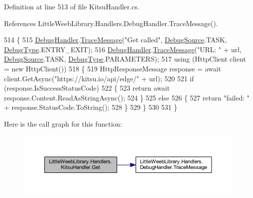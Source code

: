 Definition at line 513 of file Kitsu\+Handler.\+cs.



References Little\+Weeb\+Library.\+Handlers.\+Debug\+Handler.\+Trace\+Message().


\begin{DoxyCode}
514         \{
515             \mbox{\hyperlink{class_little_weeb_library_1_1_handlers_1_1_kitsu_handler_a6d3c55fa5eee15320845c2d902c96882}{DebugHandler}}.\mbox{\hyperlink{interface_little_weeb_library_1_1_handlers_1_1_i_debug_handler_a2e405bc3492e683cd3702fae125221bc}{TraceMessage}}(\textcolor{stringliteral}{"Get called"}, 
      \mbox{\hyperlink{namespace_little_weeb_library_1_1_handlers_a2a6ca0775121c9c503d58aa254d292be}{DebugSource}}.TASK, \mbox{\hyperlink{namespace_little_weeb_library_1_1_handlers_ab66019ed40462876ec4e61bb3ccb0a62}{DebugType}}.ENTRY\_EXIT);
516             \mbox{\hyperlink{class_little_weeb_library_1_1_handlers_1_1_kitsu_handler_a6d3c55fa5eee15320845c2d902c96882}{DebugHandler}}.\mbox{\hyperlink{interface_little_weeb_library_1_1_handlers_1_1_i_debug_handler_a2e405bc3492e683cd3702fae125221bc}{TraceMessage}}(\textcolor{stringliteral}{"URL: "} + url, 
      \mbox{\hyperlink{namespace_little_weeb_library_1_1_handlers_a2a6ca0775121c9c503d58aa254d292be}{DebugSource}}.TASK, \mbox{\hyperlink{namespace_little_weeb_library_1_1_handlers_ab66019ed40462876ec4e61bb3ccb0a62}{DebugType}}.PARAMETERS);
517             \textcolor{keyword}{using} (HttpClient client = \textcolor{keyword}{new} HttpClient())
518             \{
519                 HttpResponseMessage response = await client.GetAsync(\textcolor{stringliteral}{"https://kitsu.io/api/edge/"} + url);
520 
521                 \textcolor{keywordflow}{if} (response.IsSuccessStatusCode)
522                 \{
523                     \textcolor{keywordflow}{return} await response.Content.ReadAsStringAsync();
524                 \}
525                 \textcolor{keywordflow}{else}
526                 \{
527                     \textcolor{keywordflow}{return} \textcolor{stringliteral}{"failed: "} + response.StatusCode.ToString();
528                 \}
529             \}
530 
531         \}
\end{DoxyCode}
Here is the call graph for this function\+:\nopagebreak
\begin{figure}[H]
\begin{center}
\leavevmode
\includegraphics[width=350pt]{class_little_weeb_library_1_1_handlers_1_1_kitsu_handler_a8b7c629a03096c3152252f6b5cf2937f_cgraph}
\end{center}
\end{figure}


